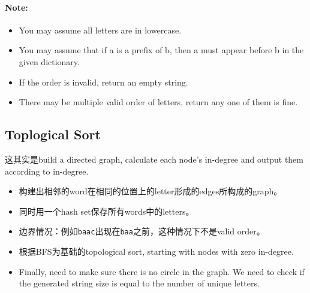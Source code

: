 \paragraph{Note:}

\begin{itemize}
\item You may assume all letters are in lowercase.
\item You may assume that if a is a prefix of b, then a must appear before b in the given dictionary.
\item If the order is invalid, return an empty string.
\item There may be multiple valid order of letters, return any one of them is fine.
\end{itemize}
\subsection{Toplogical Sort}
这其实是build a directed graph, calculate each node's in-degree and output them according to in-degree.
\begin{itemize}
\item 构建出相邻的word在相同的位置上的letter形成的edges所构成的graph。
\item 同时用一个hash set保存所有words中的letters。
\item 边界情况：例如\texttt{baac}出现在\texttt{baa}之前，这种情况下不是valid order。
\item 根据BFS为基础的topological sort, starting with nodes with zero in-degree. 
\item Finally, need to make sure there is no circle in the graph. We need to check if the generated string size is equal to the number of unique letters.
\end{itemize}

